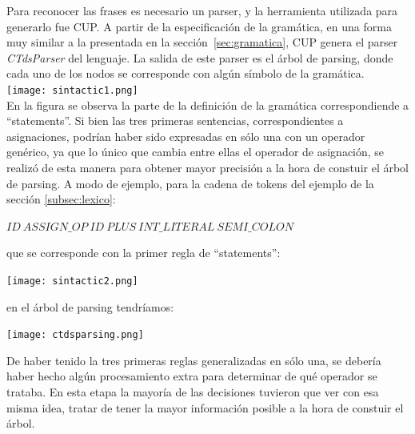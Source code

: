 \documentclass[11pt,a4paper]{article}
\begin{document}
Para reconocer las frases es necesario un parser, y la herramienta utilizada para generarlo fue CUP. A partir de la especificación de la gramática, en una forma muy similar a la presentada en la sección~\ref{sec:gramatica}, CUP genera el parser \textit{CTdsParser} del lenguaje. La salida de este parser es el árbol de parsing, donde cada uno de los nodos se corresponde con algún símbolo de la gramática.
\\

\texttt{[image: sintactic1.png]} \\ 

En la figura se observa la parte de la definición de la gramática correspondiende a ``statements''. Si bien las tres primeras sentencias, correspondientes a asignaciones, podrían haber sido expresadas en sólo una con un operador genérico, ya que lo único que cambia entre ellas el operador de asignación, se realizó de esta manera para obtener mayor precisión a la hora de constuir el árbol de parsing. A modo de ejemplo, para la cadena de tokens del ejemplo de la sección \ref{subsec:lexico}:
\begin{center}
	$ID \ ASSIGN\_OP \ ID \ PLUS \ INT\_LITERAL \ SEMI\_COLON$
\end{center}
que se corresponde con la primer regla de ``statements'':	
\begin{center}
\texttt{[image: sintactic2.png]} \\
\end{center}
en el árbol de parsing tendríamos:
\\
\begin{center}
\texttt{[image: ctdsparsing.png]} \\
\end{center}

De haber tenido la tres primeras reglas generalizadas en sólo una, se debería haber hecho algún procesamiento extra para determinar de qué operador se trataba. En esta etapa la mayoría de las decisiones tuvieron que ver con esa misma idea, tratar de tener la mayor información posible a la hora de constuir el árbol.
\end{document}
